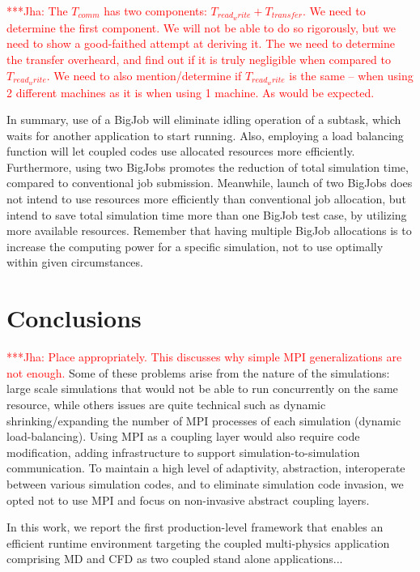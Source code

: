 \documentclass[conference,final]{IEEEtran}
\newcommand{\jhanote}[1]{ {\textcolor{red} { ***Jha: #1 }}}
\newcommand{\jhanote}[1]{}
\begin{document}
\jhanote{The $T_{comm}$ has two components: $T_{read_write} +
  T_{transfer}$. We need to determine the first component. We will not
  be able to do so rigorously, but we need to show a good-faithed
  attempt at deriving it.  The we need to determine the transfer
  overheard, and find out if it is truly negligible when compared to
  $T_{read_write}$. We need to also mention/determine if
  $T_{read_write}$ is the same -- when using 2 different machines as
  it is when using 1 machine. As would be expected.}

In summary, use of a BigJob will eliminate idling operation of a
subtask, which waits for another application to start running. Also,
employing a load balancing function will let coupled codes use
allocated resources more efficiently. Furthermore, using two BigJobs
promotes the reduction of total simulation time, compared to
conventional job submission. Meanwhile, launch of two BigJobs does not
intend to use resources more efficiently than conventional job
allocation, but intend to save total simulation time more than one
BigJob test case, by utilizing more available resources. Remember that
having multiple BigJob allocations is to increase the computing power
for a specific simulation, not to use optimally within given
circumstances.

\section{Conclusions}

\jhanote{Place appropriately. This discusses why simple MPI
  generalizations are not enough.} Some of these problems arise from
the nature of the simulations: large scale simulations that would not
be able to run concurrently on the same resource, while others issues
are quite technical such as dynamic shrinking/expanding the number of
MPI processes of each simulation (dynamic load-balancing). Using MPI
as a coupling layer would also require code modification, adding
infrastructure to support simulation-to-simulation communication. To
maintain a high level of adaptivity, abstraction, interoperate between
various simulation codes, and to eliminate simulation code invasion,
we opted not to use MPI and focus on non-invasive abstract coupling
layers.

In this work, we report the first production-level framework that
enables an efficient runtime environment targeting the coupled
multi-physics application comprising MD and CFD as two coupled stand
alone applications...
\end{document}
